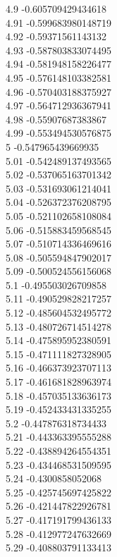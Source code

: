 {4.9	-0.605709429434618\\
4.91	-0.599683980148719\\
4.92	-0.59371561143132\\
4.93	-0.587803833074495\\
4.94	-0.581948158226477\\
4.95	-0.576148103382581\\
4.96	-0.570403188375927\\
4.97	-0.564712936367941\\
4.98	-0.55907687383867\\
4.99	-0.553494530576875\\
5	-0.547965439669935\\
5.01	-0.542489137493565\\
5.02	-0.537065163701342\\
5.03	-0.531693061214041\\
5.04	-0.526372376208795\\
5.05	-0.521102658108084\\
5.06	-0.515883459568545\\
5.07	-0.510714336469616\\
5.08	-0.505594847902017\\
5.09	-0.500524556156068\\
5.1	-0.495503026709858\\
5.11	-0.490529828217257\\
5.12	-0.485604532495772\\
5.13	-0.480726714514278\\
5.14	-0.475895952380591\\
5.15	-0.471111827328905\\
5.16	-0.466373923707113\\
5.17	-0.461681828963974\\
5.18	-0.457035133636173\\
5.19	-0.452433431335255\\
5.2	-0.447876318734433\\
5.21	-0.443363395555288\\
5.22	-0.438894264554351\\
5.23	-0.434468531509595\\
5.24	-0.4300858052068\\
5.25	-0.425745697425822\\
5.26	-0.421447822926781\\
5.27	-0.417191799436133\\
5.28	-0.412977247632669\\
5.29	-0.408803791133413\\
}
